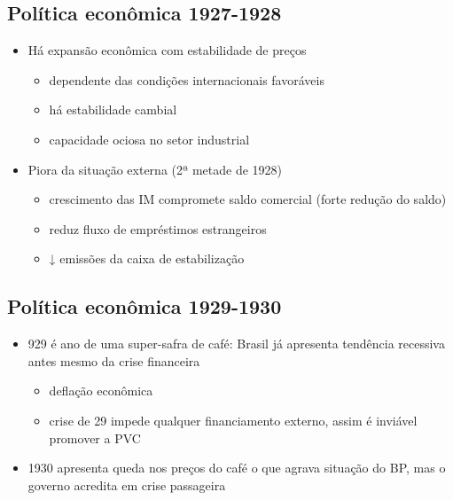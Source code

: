 \documentclass[a4paper,12pt]{article}[abntex2]
\begin{document}
\subsection{\textbf{Política econômica 1927-1928}}
\begin{itemize}
    \item Há expansão econômica com estabilidade de preços
    \begin{itemize}
        \item dependente das condições internacionais favoráveis
    \end{itemize}
    \begin{itemize}
        \item há estabilidade cambial
    \end{itemize}
    \begin{itemize}
        \item capacidade ociosa no setor industrial
    \end{itemize}
    \item Piora da situação externa (2ª metade de 1928)
    \begin{itemize}
        \item crescimento das IM compromete saldo comercial (forte redução do saldo)
    \end{itemize}
    \begin{itemize}
        \item reduz fluxo de empréstimos estrangeiros
    \end{itemize}
    \begin{itemize}
        \item  ↓ emissões da caixa de estabilização
    \end{itemize}
\end{itemize}
\subsection{\textbf{Política econômica 1929-1930}}
\begin{itemize}
    \item 929 é ano de uma super-safra de café: Brasil já apresenta tendência recessiva antes mesmo da crise financeira
    \begin{itemize}
        \item  deflação econômica
    \end{itemize}
    \begin{itemize}
        \item  crise de 29 impede qualquer financiamento externo, assim é inviável promover a PVC
    \end{itemize}
    \item 1930 apresenta queda nos preços do café o que agrava situação do BP, mas o governo acredita em crise passageira
\end{itemize}
\end{document}
